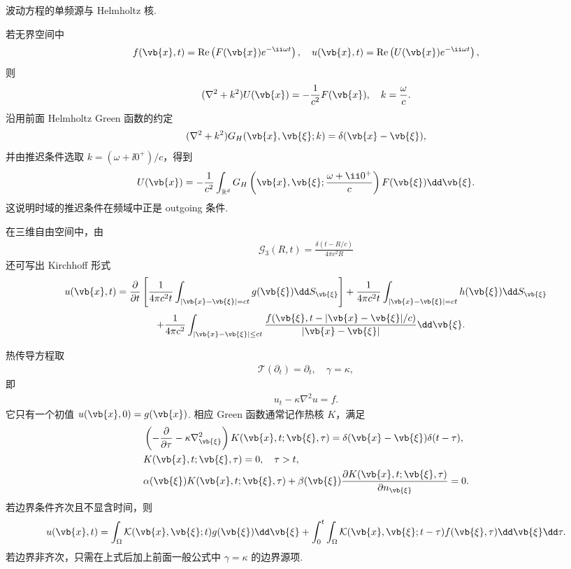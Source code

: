 \begin{exbox}
	波动方程的单频源与 Helmholtz 核.
	
	若无界空间中
	\begin{align*}
		f(\vb{x},t)=\operatorname{Re}\left(F(\vb{x})e^{-\ii\omega t}\right),
		\quad
		u(\vb{x},t)=\operatorname{Re}\left(U(\vb{x})e^{-\ii\omega t}\right),
	\end{align*}
	则
	\begin{align*}
		(\nabla^2+k^2)U(\vb{x})=-\frac{1}{c^2}F(\vb{x}),
		\quad k=\frac{\omega}{c}.
	\end{align*}
	沿用前面 Helmholtz Green 函数的约定
	\begin{align*}
		(\nabla^2+k^2)G_H(\vb{x},\vb{\xi};k)=\delta(\vb{x}-\vb{\xi}),
	\end{align*}
	并由推迟条件选取 \(k=(\omega+\ii0^+)/c\)，得到
	\begin{align*}
		U(\vb{x})=-\frac{1}{c^2}\int_{\mathbb{R}^d}
		G_H\left(\vb{x},\vb{\xi};\frac{\omega+\ii0^+}{c}\right)
		F(\vb{\xi})\dd\vb{\xi}.
	\end{align*}
	这说明时域的推迟条件在频域中正是 outgoing 条件.
\end{exbox}

在三维自由空间中，由
\begin{align*}
	\mathcal{G}_3(R,t)=\frac{\delta(t-R/c)}{4\pi c^2R}
\end{align*}
还可写出 Kirchhoff 形式
\begin{align*}
	u(\vb{x},t)=\frac{\partial}{\partial t}\left[
	\frac{1}{4\pi c^2t}\int_{|\vb{x}-\vb{\xi}|=ct}g(\vb{\xi})\dd S_{\vb{\xi}}
	\right]
	+\frac{1}{4\pi c^2t}\int_{|\vb{x}-\vb{\xi}|=ct}h(\vb{\xi})\dd S_{\vb{\xi}}
\end{align*}
\begin{align*}
	\quad+\frac{1}{4\pi c^2}\int_{|\vb{x}-\vb{\xi}|\leq ct}
	\frac{f(\vb{\xi},t-|\vb{x}-\vb{\xi}|/c)}{|\vb{x}-\vb{\xi}|}\dd\vb{\xi}.
\end{align*}

热传导方程取
\begin{align*}
	\mathcal{T}(\partial_t)=\partial_t,
	\quad \gamma=\kappa,
\end{align*}
即
\begin{align*}
	u_t-\kappa\nabla^2u=f.
\end{align*}
它只有一个初值 \(u(\vb{x},0)=g(\vb{x})\). 相应 Green 函数通常记作热核 \(K\)，满足
\begin{align*}
	&\left(-\frac{\partial}{\partial\tau}-\kappa\nabla_{\vb{\xi}}^2\right)
	K(\vb{x},t;\vb{\xi},\tau)
	=\delta(\vb{x}-\vb{\xi})\delta(t-\tau),\\
	&K(\vb{x},t;\vb{\xi},\tau)=0,\quad \tau>t,\\
	&\alpha(\vb{\xi})K(\vb{x},t;\vb{\xi},\tau)
	+\beta(\vb{\xi})\frac{\partial K(\vb{x},t;\vb{\xi},\tau)}{\partial n_{\vb{\xi}}}=0.
\end{align*}
若边界条件齐次且不显含时间，则
\begin{align*}
	u(\vb{x},t)=\int_\Omega \mathcal{K}(\vb{x},\vb{\xi};t)g(\vb{\xi})\dd\vb{\xi}
	+\int_0^t\int_\Omega \mathcal{K}(\vb{x},\vb{\xi};t-\tau)f(\vb{\xi},\tau)\dd\vb{\xi}\dd\tau.
\end{align*}
若边界非齐次，只需在上式后加上前面一般公式中 \(\gamma=\kappa\) 的边界源项.

